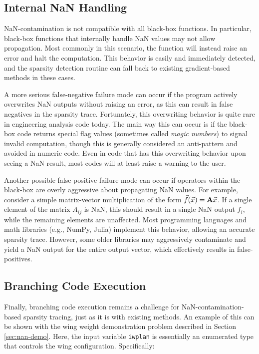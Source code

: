 \subsection{Internal NaN Handling}

NaN-contamination is not compatible with all black-box functions. In particular, black-box functions that internally handle NaN values may not allow propagation. Most commonly in this scenario, the function will instead raise an error and halt the computation. This behavior is easily and immediately detected, and the sparsity detection routine can fall back to existing gradient-based methods in these cases.

A more serious false-negative failure mode can occur if the program actively overwrites NaN outputs without raising an error, as this can result in false negatives in the sparsity trace. Fortunately, this overwriting behavior is quite rare in engineering analysis code today. The main way this can occur is if the black-box code returns special flag values (sometimes called \emph{magic numbers}) to signal invalid computation, though this is generally considered an anti-pattern and avoided in numeric code. Even in code that has this overwriting behavior upon seeing a NaN result, most codes will at least raise a warning to the user.

Another possible false-positive failure mode can occur if operators within the black-box are overly aggressive about propagating NaN values. For example, consider a simple matrix-vector multiplication of the form $\vec{f}(\vec{x}) = \mathbf{A} \vec{x}$. If a single element of the matrix $A_{ij}$ is NaN, this should result in a single NaN output $f_i$, while the remaining elements are unaffected. Most programming languages and math libraries (e.g., NumPy, Julia) implement this behavior, allowing an accurate sparsity trace. However, some older libraries may aggressively contaminate and yield a NaN output for the entire output vector, which effectively results in false-positives.

\subsection{Branching Code Execution}
\label{sec:nan-bce}

Finally, branching code execution remains a challenge for NaN-contamination-based sparsity tracing, just as it is with existing methods. An example of this can be shown with the wing weight demonstration problem described in Section \ref{sec:nan-demo}. Here, the input variable \texttt{iwplan} is essentially an enumerated type that controls the wing configuration. Specifically:

